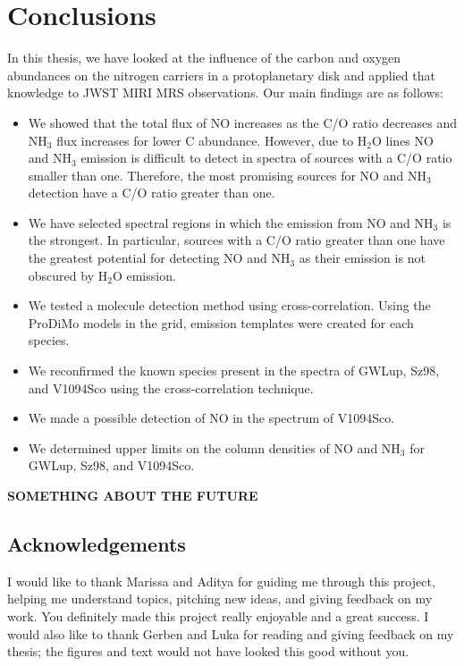 \documentclass[oneside, single, authoryear, semicolon, 12pt]{lion-msc}
\newcommand{\4}{$_4$}
\newcommand{\3}{$_3$}
\newcommand{\2}{$_2$}
\begin{document}
\chapter{Conclusions}\label{Ch: Conclusions}
In this thesis, we have looked at the influence of the carbon and oxygen abundances on the nitrogen carriers in a protoplanetary disk and applied that knowledge to JWST MIRI MRS observations. Our main findings are as follows:
\begin{itemize}
    \item We showed that the total flux of NO increases as the C/O ratio decreases and NH\3 flux increases for lower C abundance. However, due to H\2O lines NO and NH\3 emission is difficult to detect in spectra of sources with a C/O ratio smaller than one. Therefore, the most promising sources for NO and NH\3 detection have a C/O ratio greater than one.
    \item We have selected spectral regions in which the emission from NO and NH\3 is the strongest. In particular, sources with a C/O ratio greater than one have the greatest potential for detecting NO and NH\3 as their emission is not obscured by H\2O emission.
    \item We tested a molecule detection method using cross-correlation. Using the ProDiMo models in the grid, emission templates were created for each species. 
    \item We reconfirmed the known species present in the spectra of GWLup, Sz98, and V1094Sco using the cross-correlation technique.
    \item We made a possible detection of NO in the spectrum of V1094Sco.
    \item We determined upper limits on the column densities of NO and NH\3 for GWLup, Sz98, and V1094Sco.
\end{itemize}
\textbf{SOMETHING ABOUT THE FUTURE}

\section*{Acknowledgements}
I would like to thank Marissa and Aditya for guiding me through this project, helping me understand topics, pitching new ideas, and giving feedback on my work. You definitely made this project really enjoyable and a great success. I would also like to thank Gerben and Luka for reading and giving feedback on my thesis; the figures and text would not have looked this good without you.



\end{document}
